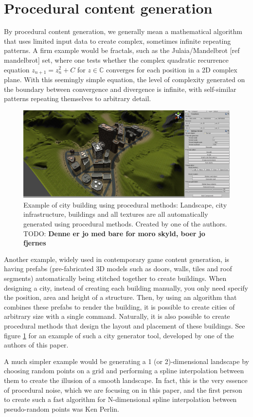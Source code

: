 \documentclass[aps,pre,twocolumn,letterpaper,floatfix,showpacs]{revtex4}
\newcommand{\todo}[1]{ {\color{Magenta} TODO: \color{Blue} \textbf{#1} }}
\begin{document}
\section{Procedural content generation}
By procedural content generation, we generally mean a mathematical algorithm that uses limited input data to create complex, sometimes infinite repeating patterns. A firm example would be fractals, such as the Julaia/Mandelbrot [ref mandelbrot] set, where one tests whether the complex quadratic recurrence equation $z_{n+1} = z_n^2 +C$ for $z \in \mathbb C$ converges for each position in a 2D complex plane. With this seemingly simple equation, the level of complexity generated on the boundary between convergence and divergence is infinite, with self-similar patterns repeating themselves to arbitrary detail.
\begin{figure}
\includegraphics[width=.5\textwidth]{orphancity.png}
\caption{Example of city building using procedural methods: Landscape, city infrastructure, buildings and all textures are all automatically generated using procedural methods. Created by one of the authors. \todo{Denne er jo med bare for moro skyld, boer jo fjernes} }
\label{fig:orphancity}
\end{figure}

Another example, widely used in contemporary game content generation, is having prefabs (pre-fabricated 3D models such as doors, walls, tiles and roof segments) automatically being stitched together to create buildings. When designing a city, instead of creating each building manually, you only need specify the position, area and height of a structure. Then, by using an algorithm that combines these prefabs to render the building, it is possible to create cities of arbitrary size with a single command. Naturally, it is also possible to create procedural methods that design the layout and placement of these buildings. See figure \ref{fig:orphancity} for an example of such a city generator tool, developed by one of the authors of this paper. 

A much simpler example would be generating a 1 (or 2)-dimensional landscape by choosing random points on a grid and performing a spline interpolation between them to create the illusion of a smooth landscape. In fact, this is the very essence of procedural noise, which we are focusing on in this paper, and the first person to create such a fast algorithm for N-dimensional spline interpolation between pseudo-random points was Ken Perlin.   
\end{document}
